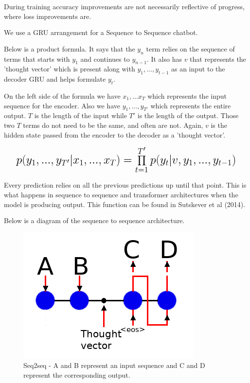 During training accuracy improvements are not necessarily reflective of progress, where loss improvements are.

We use a GRU arrangement for a Sequence to Sequence chatbot.

Below is a product formula. It says that the $y_n$ term relies on the sequence of terms that starts with $y_1$ and continues to $y_{n-1}$. It also has $v$ that represents the 'thought vector' which is present along with $y_1,...,y_{t-1}$ as an input to the decoder GRU and helps formulate $y_t$.

On the left side of the formula we have $x_1,...x_T$ which represents the input sequence for the encoder. Also we have $y_1,...,y_{T'}$ which represents the entire output. $T$ is the length of the input while $T'$ is the length of the output. Those two $T$ terms do not need to be the same, and often are not. Again, $v$ is the hidden state passed from the encoder to the decoder as a 'thought vector'.

\[
\mathlarger{ \mathlarger{ \mathlarger{
		p(y_1,...,y_{T'}|x_1,...,x_T) = \prod_{t=1}^{T'} p(y_t|v,y_1,..., y_{t-1}) 
} } }
\]

Every prediction relies on all the previous predictions up until that point. This is what happens in sequence to sequence and transformer architectures when the model is producing output. This function can be found in Sutskever et al (2014)\cite{DBLP:journals/corr/SutskeverVL14}.

Below is a diagram of the sequence to sequence architecture.

\begin{figure}[H]

\begin{center}

\includegraphics[scale=0.5]{diagram-nmt}

	
\end{center}

\caption[Sequence to Sequence]{Seq2seq - A and B represent an input sequence and C and D represent the corresponding output.}

\end{figure}


